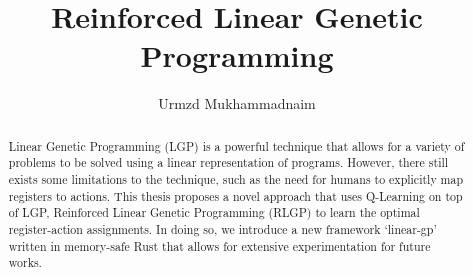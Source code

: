 \documentclass[12pt, final]{dalcsthesis}
\begin{document}
\bcshon
\title{Reinforced Linear Genetic Programming}
\author{Urmzd Mukhammadnaim}

\reader{}

\nolistoftables
\nolistoffigures

\frontmatter

\nocite{*}

\begin{abstract}
	Linear Genetic Programming (LGP) is a powerful technique that allows for a variety of problems to be solved using a linear representation of programs. However, there still exists some limitations to the technique, such as the need for humans to explicitly map registers to actions. This thesis proposes a novel approach that uses Q-Learning on top of LGP, Reinforced Linear Genetic Programming (RLGP) to learn the optimal register-action assignments. In doing so, we introduce a new framework `linear-gp' written in memory-safe Rust that allows for extensive experimentation for future works.
\end{abstract}
\end{document}

